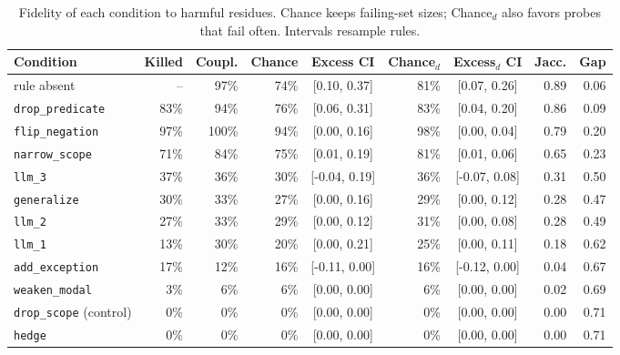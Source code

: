 \begin{table}[t]
\centering\footnotesize\setlength{\tabcolsep}{4pt}
\caption{Fidelity of each condition to harmful residues. Chance keeps failing-set sizes; Chance$_d$ also favors probes that fail often. Intervals resample rules.}\label{tab:operators}
\begin{tabular}{lrrrcrcrr}
\toprule
Condition & Killed & Coupl. & Chance & Excess CI & Chance$_d$ & Excess$_d$ CI & Jacc. & Gap \\
\midrule
rule absent & -- & 97\% & 74\% & [0.10, 0.37] & 81\% & [0.07, 0.26] & 0.89 & 0.06 \\
\texttt{drop\_predicate} & 83\% & 94\% & 76\% & [0.06, 0.31] & 83\% & [0.04, 0.20] & 0.86 & 0.09 \\
\texttt{flip\_negation} & 97\% & 100\% & 94\% & [0.00, 0.16] & 98\% & [0.00, 0.04] & 0.79 & 0.20 \\
\texttt{narrow\_scope} & 71\% & 84\% & 75\% & [0.01, 0.19] & 81\% & [0.01, 0.06] & 0.65 & 0.23 \\
\texttt{llm\_3} & 37\% & 36\% & 30\% & [-0.04, 0.19] & 36\% & [-0.07, 0.08] & 0.31 & 0.50 \\
\texttt{generalize} & 30\% & 33\% & 27\% & [0.00, 0.16] & 29\% & [0.00, 0.12] & 0.28 & 0.47 \\
\texttt{llm\_2} & 27\% & 33\% & 29\% & [0.00, 0.12] & 31\% & [0.00, 0.08] & 0.28 & 0.49 \\
\texttt{llm\_1} & 13\% & 30\% & 20\% & [0.00, 0.21] & 25\% & [0.00, 0.11] & 0.18 & 0.62 \\
\texttt{add\_exception} & 17\% & 12\% & 16\% & [-0.11, 0.00] & 16\% & [-0.12, 0.00] & 0.04 & 0.67 \\
\texttt{weaken\_modal} & 3\% & 6\% & 6\% & [0.00, 0.00] & 6\% & [0.00, 0.00] & 0.02 & 0.69 \\
\texttt{drop\_scope} (control) & 0\% & 0\% & 0\% & [0.00, 0.00] & 0\% & [0.00, 0.00] & 0.00 & 0.71 \\
\texttt{hedge} & 0\% & 0\% & 0\% & [0.00, 0.00] & 0\% & [0.00, 0.00] & 0.00 & 0.71 \\
\bottomrule
\end{tabular}
\end{table}
